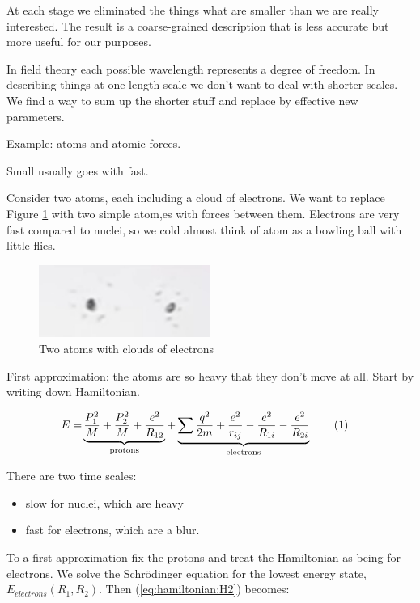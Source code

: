 \documentclass[]{article}
\newcommand\numberthis{\addtocounter{equation}{1}\tag{\theequation}}
\begin{document}
At each stage we eliminated the things what are smaller than we are really interested. The result is a coarse-grained description that is less accurate but more useful for our purposes.

In field theory each possible wavelength represents a degree of freedom. In describing things at one length scale we don't want to deal with shorter scales. We find a way to sum up the shorter stuff and replace by effective new parameters.

Example: atoms and atomic forces.

Small usually goes with fast.

Consider two atoms, each including a cloud of electrons. We want to replace Figure \ref{fig:3-2-atoms} with two simple atom,es with forces between them. Electrons are very fast compared to nuclei, so we cold almost think of atom as a bowling ball with little flies.

\begin{figure}[H]
	\begin{center}
		\caption{Two atoms with clouds of electrons}\label{fig:3-2-atoms}
		\includegraphics[width=0.5\textwidth]{3-2-atoms}
	\end{center}
\end{figure}

First approximation: the atoms are so heavy that they don't move at all. Start by writing down Hamiltonian.

\begin{align*}
	E=& \underbrace{\frac{P_1^2}{M} + \frac{P_2^2}{M} + \frac{e^2}{R_{12}}}_\text{protons} + \underbrace{\sum \frac{q^2}{2m} + \frac{e^2}{r_{ij}}- \frac{e^2}{R_{1i}} - \frac{e^2}{R_{2i}}}_\text{electrons} \numberthis \label{eq:hamiltonian:H2}
\end{align*}

There are two time scales:
\begin{itemize}
	\item slow for nuclei, which are heavy
	\item fast for electrons, which are a blur.
\end{itemize}

To a first approximation fix the protons and treat the Hamiltonian as being for electrons. We solve the Schr\"odinger equation for the lowest energy state, $E_{electrons}(R_1,R_2)$. Then (\ref{eq:hamiltonian:H2}) becomes:
\end{document}
